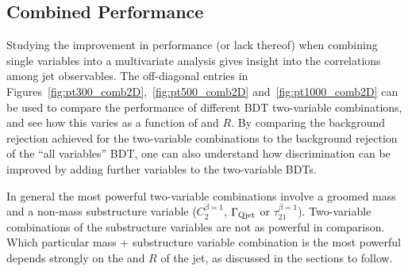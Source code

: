 %


\subsection{Combined Performance}\label{sec:w_combined}

Studying the improvement in performance (or lack thereof) when combining single variables into a multivariate analysis gives insight into the correlations
among jet observables. The off-diagonal entries in Figures~\ref{fig:pt300_comb2D},~\ref{fig:pt500_comb2D}
and~\ref{fig:pt1000_comb2D} can be used to compare the performance
of different BDT two-variable combinations, and see how this varies as
a function of \pT and $R$. By comparing the background rejection
achieved for the two-variable combinations to the background rejection
of the ``all variables'' BDT, one can also understand how 
discrimination can be improved by adding further variables to the
two-variable BDTs.

In general the most powerful two-variable
combinations involve a groomed mass and a non-mass substructure
variable ($C_2^{\beta=1}$, $\Gamma_{\rm Qjet}$ or
$\tau_{21}^{\beta=1}$). Two-variable combinations of the substructure
variables are not as powerful in comparison.  Which particular mass +
substructure variable combination is the most
powerful depends strongly on the \pT and $R$ of the jet, as discussed
in the sections to follow. 

